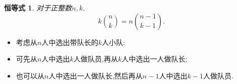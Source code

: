 \documentclass[punct]{ctexbeamer}
\newtheorem{iden}{恒等式}
\begin{document}
\begin{frame}

    \begin{iden}\label{eq:nk}
对于正整数$n,k,$
        $$
        k \binom{n}{k}=n\binom{n-1}{k-1}.
        $$
    \end{iden}
    \pause
\begin{itemize}
        \pause

\item
        考虑从$n$人中选出带队长的$k$人小队:

\item  可先从$n$人中选出$k$人做队员,再从$k$人中选出一人做队长;


\item 也可以从$n$人中选出一人做队长,然后再从$n-1$人中选出$k-1$人做队员.

    \end{itemize}

\end{frame}
\end{document}
